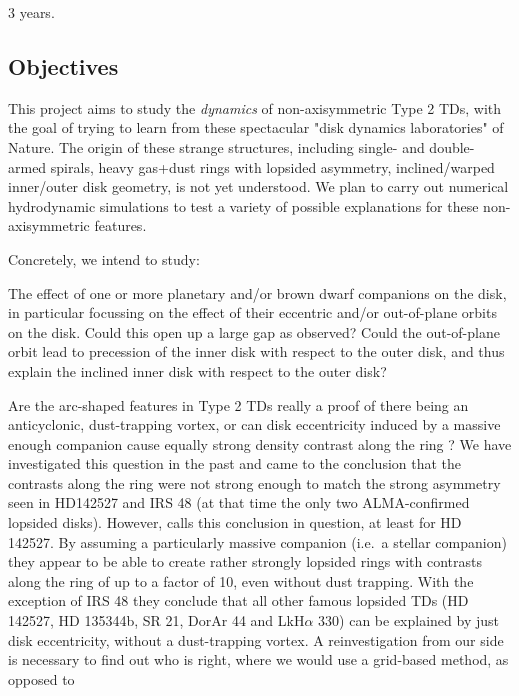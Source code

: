 \documentclass[10pt,fleqn,twoside,a4paper]{article}
\begin{document}
3 years.

\subsection{Objectives}
This project aims to study the {\em dynamics} of non-axisymmetric Type 2
TDs, with the goal of trying to learn from these spectacular "disk dynamics
laboratories" of Nature. The origin of these strange structures, including
single- and double-armed spirals, heavy gas+dust rings with lopsided
asymmetry, inclined/warped inner/outer disk geometry, is not yet understood.
We plan to carry out numerical hydrodynamic simulations to test a variety of
possible explanations for these non-axisymmetric features. 

Concretely, we intend to study:
\begin{compactenumerate}
\item The effect of one or more planetary and/or brown dwarf companions on
  the disk, in particular focussing on the effect of their eccentric and/or
  out-of-plane orbits on the disk. Could this open up a large gap as
  observed? Could the out-of-plane orbit lead to precession of the inner
  disk with respect to the outer disk, and thus explain the inclined inner
  disk with respect to the outer disk? 
\item Are the arc-shaped features in Type 2 TDs really a proof of there
  being an anticyclonic, dust-trapping vortex, or can disk eccentricity
  induced by a massive enough companion cause equally strong density
  contrast along the ring \citep[see e.g.][]{2006A&A...447..369K}? We have
  investigated this question in the past \citep{2013A&A...553L...3A} and
  came to the conclusion that the contrasts along the ring were not strong
  enough to match the strong asymmetry seen in HD142527 and IRS 48 (at that
  time the only two ALMA-confirmed lopsided disks). However,
  \citet{2017MNRAS.464.1449R} calls this conclusion in question, at least
  for HD 142527. By assuming a particularly massive companion (i.e.~a
  stellar companion) they appear to be able to create rather strongly
  lopsided rings with contrasts along the ring of up to a factor of 10, even
  without dust trapping. With the exception of IRS 48 they conclude that all
  other famous lopsided TDs (HD 142527, HD 135344b, SR 21, DorAr 44 and
  LkH$\alpha$ 330) can be explained by just disk eccentricity, without a
  dust-trapping vortex. A reinvestigation from our side is necessary to find
  out who is right, where we would use a grid-based method, as opposed to

\end{compactenumerate}
\end{document}
